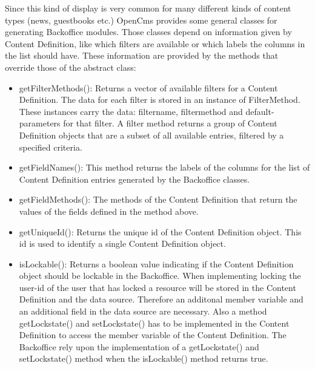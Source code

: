 Since this kind of display is very common for many different kinds of
content types (news, guestbooks etc.) OpenCms provides some general
classes for generating Backoffice modules. Those classes depend on
information given by Content Definition, like which filters are available
or which labels the columns in the list should have. These information are
provided by the methods that override those of the abstract class:

\begin{itemize}
\item {\meth getFilterMethods()}: Returns a vector of available filters for
a Content Definition. The data for each filter is stored in an
instance of FilterMethod. These instances carry the data: filtername,
filtermethod and default-parameters for that filter. A filter method
returns a group of Content Definition objects that are a subset of all
available entries, filtered by a specified criteria.

\item {\name getFieldNames()}: This method returns the labels of the columns 
for the list of Content Definition entries generated by the Backoffice classes.

\item {\meth getFieldMethods()}: The methods of the Content Definition that
return the values of the fields defined in the method above.

\item {\name getUniqueId()}: Returns the unique id of the Content Definition
object. This id is used to identify a single Content Definition object.

\item {\name isLockable()}: Returns a boolean value indicating if the Content Definition
object should be lockable in the Backoffice. When implementing locking the user-id of the 
user that has locked a resource will be stored in the Content Definition and the data source.
Therefore an additonal member variable and an additional field in the data source are necessary.
Also a method  {\meth getLockstate()} and {\meth setLockstate()} has to be implemented in the 
Content Definition to access the member variable of the Content Definition.
The Backoffice rely upon the implementation of a {\meth getLockstate()} 
and {\meth setLockstate()} method when the {\meth isLockable()} 
method returns true.

\end{itemize}

